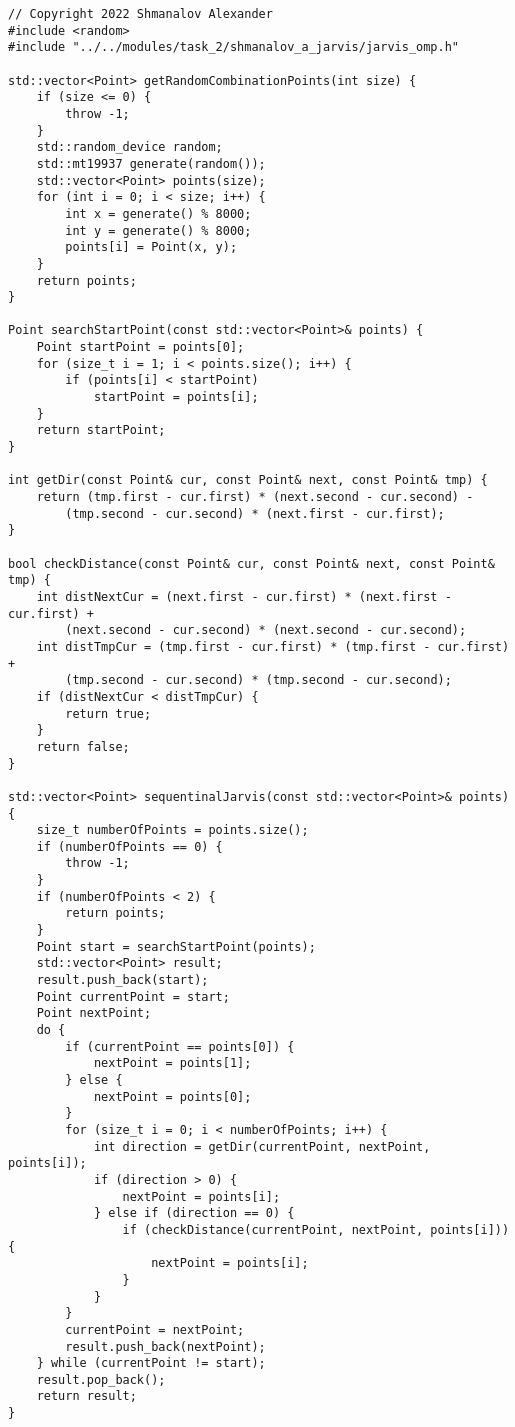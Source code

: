 \documentclass{report}
\begin{document}
\begin{lstlisting}
// Copyright 2022 Shmanalov Alexander
#include <random>
#include "../../modules/task_2/shmanalov_a_jarvis/jarvis_omp.h"

std::vector<Point> getRandomCombinationPoints(int size) {
    if (size <= 0) {
        throw -1;
    }
    std::random_device random;
    std::mt19937 generate(random());
    std::vector<Point> points(size);
    for (int i = 0; i < size; i++) {
        int x = generate() % 8000;
        int y = generate() % 8000;
        points[i] = Point(x, y);
    }
    return points;
}

Point searchStartPoint(const std::vector<Point>& points) {
    Point startPoint = points[0];
    for (size_t i = 1; i < points.size(); i++) {
        if (points[i] < startPoint)
            startPoint = points[i];
    }
    return startPoint;
}

int getDir(const Point& cur, const Point& next, const Point& tmp) {
    return (tmp.first - cur.first) * (next.second - cur.second) -
        (tmp.second - cur.second) * (next.first - cur.first);
}

bool checkDistance(const Point& cur, const Point& next, const Point& tmp) {
    int distNextCur = (next.first - cur.first) * (next.first - cur.first) +
        (next.second - cur.second) * (next.second - cur.second);
    int distTmpCur = (tmp.first - cur.first) * (tmp.first - cur.first) +
        (tmp.second - cur.second) * (tmp.second - cur.second);
    if (distNextCur < distTmpCur) {
        return true;
    }
    return false;
}

std::vector<Point> sequentinalJarvis(const std::vector<Point>& points) {
    size_t numberOfPoints = points.size();
    if (numberOfPoints == 0) {
        throw -1;
    }
    if (numberOfPoints < 2) {
        return points;
    }
    Point start = searchStartPoint(points);
    std::vector<Point> result;
    result.push_back(start);
    Point currentPoint = start;
    Point nextPoint;
    do {
        if (currentPoint == points[0]) {
            nextPoint = points[1];
        } else {
            nextPoint = points[0];
        }
        for (size_t i = 0; i < numberOfPoints; i++) {
            int direction = getDir(currentPoint, nextPoint, points[i]);
            if (direction > 0) {
                nextPoint = points[i];
            } else if (direction == 0) {
                if (checkDistance(currentPoint, nextPoint, points[i])) {
                    nextPoint = points[i];
                }
            }
        }
        currentPoint = nextPoint;
        result.push_back(nextPoint);
    } while (currentPoint != start);
    result.pop_back();
    return result;
}


\end{lstlisting}
\end{document}
